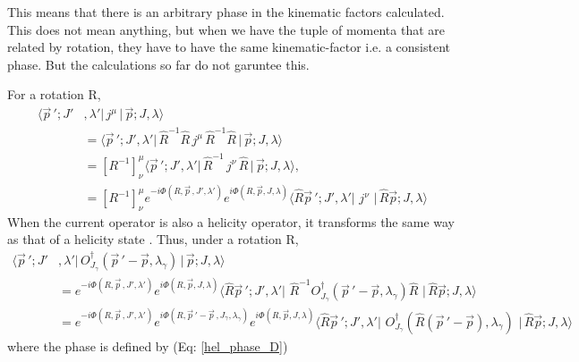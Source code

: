 \documentclass[10pt]{article}
\begin{document}
This means that there is an arbitrary phase in the kinematic factors calculated. This does not mean anything, but when we have the tuple of momenta that are related by rotation, they have to have the same kinematic-factor i.e. a consistent phase. But the calculations so far do not garuntee this. \par
For a rotation R,
\begin{align*}
\big\langle \vec{p}\,'; J'& ,\lambda'  \big| \, j^\mu \, \big| \, \vec{p}; J, \lambda  \big\rangle  \\
 &= \big\langle \vec{p}\,'; J' ,\lambda' \big| \, \hat{R}^{-1}\hat{R} \, j^\mu \,  \hat{R}^{-1}\hat{R} \, \big| \, \vec{p}; J, \lambda  \big\rangle \\
&= \left[R^{-1}\right]^\mu_\nu    \big\langle \vec{p}\,'; J' ,\lambda'  \big|\,  \hat{R}^{-1} \, j^\nu\,  \hat{R} \, \big| \, \vec{p}; J, \lambda  \big\rangle,\\
&=  \left[R^{-1}\right]^\mu_\nu    e^{-i \Phi(R, \vec{p}\,, J', \lambda')} e^{i \Phi(R, \vec{p}, J, \lambda)} \big\langle \hat{R}\vec{p}\,'; J' ,\lambda'  \big|\,  \, j^\nu\,  \, \big| \, \hat{R}\vec{p}; J, \lambda  \big\rangle
\end{align*}
When the current operator is also a helicity operator, it transforms the same way as that of a helicity state \cite{hel}. Thus, under a rotation R,
\begin{align}
\big\langle \vec{p}\,'; J'& ,\lambda'  \big| \, O_{J_\gamma}^{\dagger}(\vec{p}\,' - \vec{p},\lambda_{\gamma}) \, \big| \, \vec{p}; J, \lambda  \big\rangle  \\
 &=    e^{-i \Phi(R, \vec{p}\,, J', \lambda')} e^{i \Phi(R, \vec{p}, J, \lambda)} \big\langle \hat{R}\vec{p}\,'; J' ,\lambda'  \big|\,  \, \hat{R}^{-1} O_{J_\gamma}^{\dagger}(\vec{p}\,' - \vec{p},\lambda_{\gamma}) \hat{R} \,  \, \big| \, \hat{R}\vec{p}; J, \lambda  \big\rangle \\
&=    e^{-i \Phi(R, \vec{p}\,, J', \lambda')} e^{i \Phi(R, \vec{p}\,' - \vec{p}\,, J_{\gamma}, \lambda_{\gamma})}  e^{i \Phi(R, \vec{p}, J, \lambda)} \big\langle \hat{R}\vec{p}\,'; J' ,\lambda'  \big|\,  \, O_{J_\gamma}^{\dagger}(\hat{R}(\vec{p}\,' - \vec{p}),\lambda_{\gamma}) \,  \, \big| \, \hat{R}\vec{p}; J, \lambda  \big\rangle
\label{ph}
\end{align}
where the phase is defined by (Eq: \ref{hel_phase_D})
\end{document}
